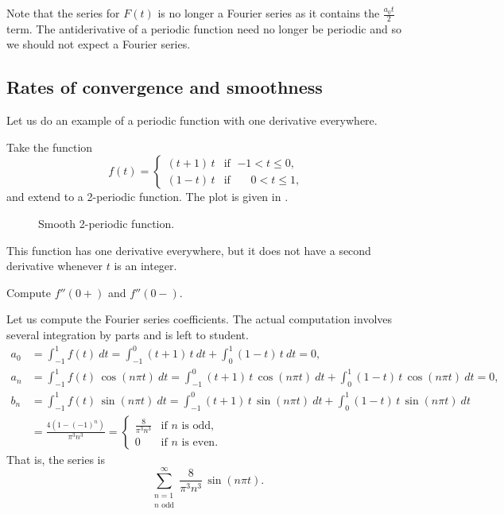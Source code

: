 Note that the series for $F(t)$ is no longer a Fourier series as it contains
the $\frac{a_0 t}{2}$ term.  The antiderivative
of a periodic function need no longer be periodic and so we should not
expect a Fourier series.

\subsection{Rates of convergence and smoothness}

Let us do an example of a periodic function with one derivative everywhere.

\begin{example}
Take the function
\begin{equation*}
f(t) =
\begin{cases}
(t+1)\,t & \text{if } \; {-1} < t \leq 0 , \\
(1-t)\,t & \text{if } \; \phantom{-}0 < t \leq 1 ,
\end{cases}
\end{equation*}
and extend to a
2-periodic function.  The plot is given in
.

\begin{figure}[h!t]
\capstart
\begin{center}
\caption{Smooth 2-periodic function.\label{gfs:smoothexfig}}
\end{center}
\end{figure}

This function has one derivative everywhere, but it
does not have a second derivative whenever $t$ is an integer.

\begin{exercise}
Compute $f''(0+)$ and $f''(0-)$.
\end{exercise}

Let us compute the Fourier series coefficients.  The actual computation
involves several integration by parts and is left to student.
\begin{align*}
a_0 & = 
\int_{-1}^1
f(t) ~ dt = 
\int_{-1}^0
(t+1)\,t ~ dt +
\int_0^1
(1-t)\,t ~ dt = 0 , \\
a_n & = 
\int_{-1}^1
f(t) \, \cos (n\pi t) ~ dt = 
\int_{-1}^0
(t+1)\,t
\, \cos (n \pi t) ~ dt +
\int_0^1
(1-t)\,t
\, \cos (n \pi t) ~ dt = 0, \\
b_n & = 
\int_{-1}^1
f(t) \, \sin (n\pi t) ~ dt = 
\int_{-1}^0
(t+1)\,t
\, \sin (n \pi t) ~ dt +
\int_0^1
(1-t)\,t
\, \sin (n \pi t) ~ dt \\
& =
\frac{4 ( 1-{(-1)}^n)}{\pi^3 n^3} 
=
\begin{cases}
\frac{8}{\pi^3 n^3} & \text{if } n \text{ is odd} , \\
0 & \text{if } n \text{ is even} .
\end{cases}
\end{align*}
That is, the series is
\begin{equation*}
\sum_{\substack{n=1 \\ n \text{ odd}}}^\infty \frac{8}{\pi^3 n^3} \, \sin (n \pi t) .
\end{equation*}


\end{example}

